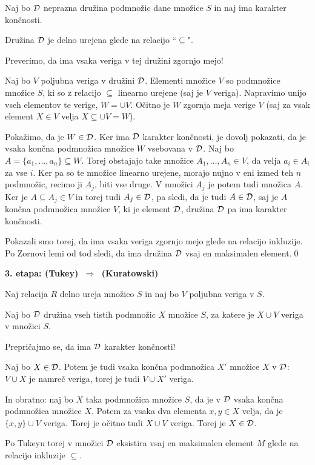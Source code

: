 \documentclass[11pt,paper=b5,footinclude,headinclude]{scrbook} %
\def\sledi {{~\Rightarrow~}}
\begin{document}
Naj bo ${\cal D}$ neprazna družina podmnožic dane množice $S$ in naj ima karakter končnosti.

Družina ${\cal D}$ je delno urejena glede na relacijo ``$\subseteq$".

Preverimo, da ima vsaka veriga v tej družini zgornjo mejo!

Naj bo $V$ poljubna veriga v družini ${\cal D}$. Elementi množice $V$ so podmnožice množice $S$, ki so z relacijo $\subseteq$ linearno urejene (saj je $V$ veriga).
Napravimo unijo vseh elementov te verige, $W = \cup V$. Očitno je $W$ zgornja meja verige $V$ (saj za vsak element $X\in V$ velja $X\subseteq \cup V = W$).

Pokažimo, da je $W\in{\cal D}$. Ker ima ${\cal D}$ karakter končnosti, je dovolj pokazati, da je vsaka končna podmnožica množice $W$ vsebovana v ${\cal D}$.
Naj bo $A=\{a_1,\ldots, a_n\}\subseteq W$. Torej obstajajo take množice $A_1,\ldots, A_n\in V$, da velja $a_i\in A_i$ za vse $i$. Ker pa so te množice linearno urejene, morajo nujno v eni izmed teh $n$ podmnožic, recimo ji $A_j$, biti vse druge. V množici $A_j$ je potem tudi množica $A$. Ker je $A\subseteq A_j\in V$ in torej tudi $A_j\in {\cal D}$, pa sledi, da je tudi $A\in {\cal D}$, saj je $A$ končna podmnožica množice $V$,
ki je element ${\cal D}$, družina ${\cal D}$ pa ima karakter končnosti.

Pokazali smo torej, da ima vsaka veriga zgornjo mejo glede na relacijo inkluzije.
Po Zornovi lemi od tod sledi, da ima družina ${\cal D}$ vsaj en maksimalen element.\qed

\bigskip
\textbf{3. etapa: (Tukey) $\sledi$ (Kuratowski)}

Naj relacija $R$ delno ureja množico $S$ in naj bo $V$ poljubna veriga v $S$.

Naj bo ${\cal D}$ družina vseh tistih podmnožic $X$ množice $S$, za katere je
$X\cup V$ veriga v množici $S$.

Prepričajmo se, da ima ${\cal D}$ karakter končnosti!

Naj bo $X\in {\cal D}$. Potem je tudi vsaka končna podmnožica $X'$ množice $X$ v ${\cal D}$: $V\cup X$ je namreč veriga, torej je tudi $V\cup X'$ veriga.

In obratno: naj bo $X$ taka podmnožica množice $S$, da je v ${\cal D}$ vsaka končna podmnožica množice $X$. Potem za vsaka dva elementa $x,y\in X$ velja, da je
$\{x,y\}\cup V$ veriga. Torej je očitno tudi $X\cup V$ veriga. Torej je $X\in {\cal D}$.

Po Tukeyu torej v množici ${\cal D}$ eksistira vsaj en maksimalen element $M$ glede na relacijo inkluzije $\subseteq$.
\end{document}
